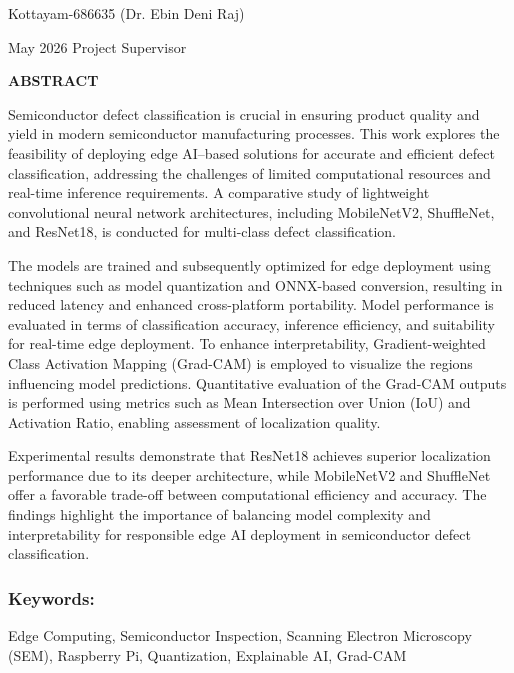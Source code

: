 \documentclass[12pt,a4wide]{report}
\theoremstyle{plain}
\theoremstyle{definition}
\theoremstyle{remark}
\begin{document}
\noindent Kottayam-686635  \hfill ({Dr. Ebin Deni Raj})

\noindent May 2026 \hfill Project Supervisor

\clearpage






\begin{center}
{\Large{\bf{ABSTRACT}}}
\end{center}

\small
Semiconductor defect classification is crucial in ensuring product quality and yield in modern semiconductor manufacturing processes. This work explores the feasibility
of deploying edge AI–based solutions for accurate and efficient defect classification, addressing the challenges of limited computational resources and real-time inference requirements. A comparative study of lightweight convolutional neural network architectures, including MobileNetV2, ShuffleNet, and ResNet18, is conducted for multi-class defect classification.

The models are trained and subsequently optimized for edge deployment using techniques such as model quantization and ONNX-based conversion, resulting in reduced latency and enhanced cross-platform portability. Model performance is evaluated in terms of classification accuracy, inference efficiency, and suitability for real-time edge deployment. To enhance interpretability, Gradient-weighted Class Activation Mapping (Grad-CAM) is employed to visualize the regions influencing model predictions. Quantitative evaluation of the Grad-CAM outputs is performed using metrics such as Mean Intersection over Union (IoU) and Activation Ratio, enabling assessment of localization quality.

Experimental results demonstrate that ResNet18 achieves superior localization performance due to its deeper architecture, while MobileNetV2 and ShuffleNet offer a favorable trade-off between computational efficiency and accuracy. The findings highlight the importance of balancing model complexity and interpretability for responsible edge AI deployment in semiconductor defect classification.

\normalsize
\subsubsection{Keywords:} Edge Computing, Semiconductor Inspection, Scanning Electron Microscopy (SEM), Raspberry Pi, Quantization, Explainable AI, Grad-CAM
\end{document}

